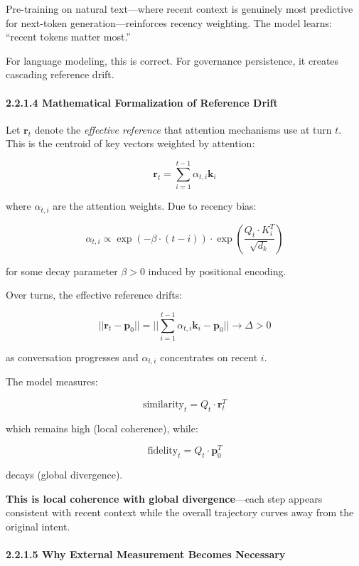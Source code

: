 Pre-training on natural text---where recent context is genuinely most
predictive for next-token generation---reinforces recency weighting. The
model learns: ``recent tokens matter most.''

For language modeling, this is correct. For governance persistence, it
creates cascading reference drift.

\paragraph{2.2.1.4 Mathematical Formalization of Reference
Drift}\label{mathematical-formalization-of-reference-drift}

Let \(\mathbf{r}_t\) denote the \emph{effective reference} that
attention mechanisms use at turn \(t\). This is the centroid of key
vectors weighted by attention:

\[\mathbf{r}_t = \sum_{i=1}^{t-1} \alpha_{t,i} \mathbf{k}_i\]

where \(\alpha_{t,i}\) are the attention weights. Due to recency bias:

\[\alpha_{t,i} \propto \exp\left(-\beta \cdot (t - i)\right) \cdot \exp\left(\frac{Q_t \cdot K_i^T}{\sqrt{d_k}}\right)\]

for some decay parameter \(\beta > 0\) induced by positional encoding.

Over turns, the effective reference drifts:

\[||\mathbf{r}_t - \mathbf{p}_0|| = ||\sum_{i=1}^{t-1} \alpha_{t,i} \mathbf{k}_i - \mathbf{p}_0|| \rightarrow \Delta > 0\]

as conversation progresses and \(\alpha_{t,i}\) concentrates on recent
\(i\).

The model measures:

\[\text{similarity}_t = Q_t \cdot \mathbf{r}_t^T\]

which remains high (local coherence), while:

\[\text{fidelity}_t = Q_t \cdot \mathbf{p}_0^T\]

decays (global divergence).

\textbf{This is local coherence with global divergence}---each step
appears consistent with recent context while the overall trajectory
curves away from the original intent.

\paragraph{2.2.1.5 Why External Measurement Becomes
Necessary}\label{why-external-measurement-becomes-necessary}

